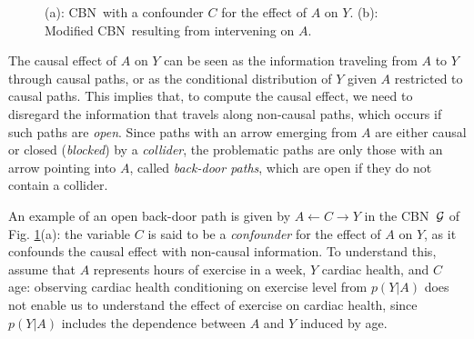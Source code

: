 \documentclass[runningheads]{llncs}
\newcommand{\figref}[1]{Fig. \ref{#1}}
\newcommand{\CBN}{CBN}
\begin{document}
\begin{figure}
\vspace{-0.8cm}
\centering
{}
\vspace{-0.35cm}
\caption{(a): \CBN~with a confounder $C$ for the effect of $A$ on $Y$. (b): Modified \CBN~resulting from intervening on $A$.}
\label{fig:CE}
\end{figure}
\noindent The causal effect of $A$ on $Y$ can be seen as the information traveling from $A$ to $Y$ through causal paths, or as the conditional distribution of $Y$ given $A$ restricted to causal paths. This implies that, to compute the causal effect, we need to disregard the information that travels along non-causal paths, which occurs if such paths are \emph{open}. Since paths with an arrow emerging from $A$ are either causal or closed (\emph{blocked}) by a \emph{collider}, the problematic paths are only those with an arrow pointing into $A$, called \emph{back-door paths}, which are open if they do not contain a collider.

An example of an open back-door path is given by $A\leftarrow C \rightarrow Y$ in the \CBN~${\cal G}$ of \figref{fig:CE}(a): 
the variable $C$ is said to be a \emph{confounder} for the effect of $A$ on $Y$, as it confounds the causal effect with non-causal information. 
To understand this, assume that $A$ represents hours of exercise in a week, $Y$ cardiac health, and $C$ age: observing cardiac health conditioning on exercise level from $p(Y|A)$ does not enable us to understand the effect of exercise on cardiac health, since $p(Y|A)$ includes the dependence between $A$ and $Y$ induced by age.
\end{document}
